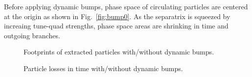 \documentclass[aps,prstab,onecolumn,preprint,nofootinbib]{revtex4-1}
\begin{document}
Before applying dynamic bumps, phase space of circulating particles are centered at the origin as shown in Fig.~\ref{fig:bump0}.
As the separatrix is squeezed by increaing tune-quad strengths, phase space areas are shrinking in time and outgoing branches.


\begin{figure}[tbh!]
  \begin{center}
    \caption{\label{fig:bump4}Footprints of extracted particles with/without dynamic bumps.}
  \end{center}
\end{figure}

\begin{figure}[tbh!]
  \begin{center}
    \caption{\label{fig:bump5}Particle losses in time with/without dynamic bumps.}
  \end{center}
\end{figure}
\end{document}
